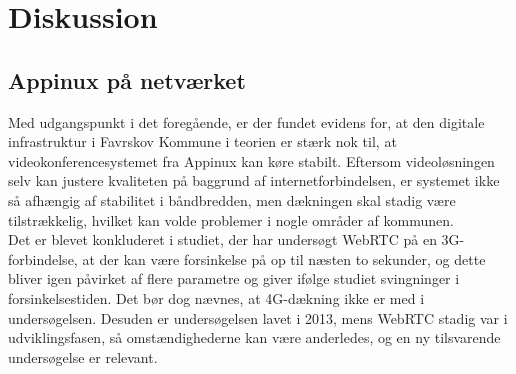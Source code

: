 \section{Diskussion}
\subsection{Appinux på netværket}
Med udgangspunkt i det foregående, er der fundet evidens for, at den digitale infrastruktur i Favrskov Kommune i teorien er stærk nok til, at videokonferencesystemet fra Appinux kan køre stabilt. Eftersom videoløsningen selv kan justere kvaliteten på baggrund af internetforbindelsen, er systemet ikke så afhængig af stabilitet i båndbredden, men dækningen skal stadig være tilstrækkelig, hvilket kan volde problemer i nogle områder af kommunen.\\
Det er blevet konkluderet i studiet\cite{webrtcjournal}, der har undersøgt WebRTC på en 3G-forbindelse, at der kan være forsinkelse på op til næsten to sekunder, og dette bliver igen påvirket af flere parametre og giver ifølge studiet svingninger i forsinkelsestiden. Det bør dog nævnes, at 4G-dækning ikke er med i undersøgelsen. Desuden er undersøgelsen lavet i 2013, mens WebRTC stadig var i udviklingsfasen, så omstændighederne kan være anderledes, og en ny tilsvarende undersøgelse er relevant.
